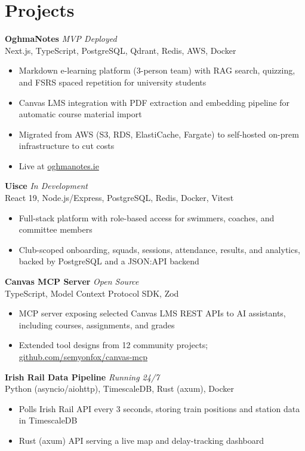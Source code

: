 \documentclass[11pt]{article}
\newcommand{\cventry}[4]{%
  \noindent\textbf{\large #1} \hfill \emph{#2}\\
  {\color{secondary}#3} \hfill {\color{secondary}#4}%
}
\begin{document}
\section*{Projects}

\cventry{OghmaNotes}{MVP Deployed}
        {Next.js, TypeScript, PostgreSQL, Qdrant, Redis, AWS, Docker}{}
\begin{itemize}
  \item Markdown e-learning platform (3-person team) with RAG search, quizzing, and FSRS spaced repetition for university students
  \item Canvas LMS integration with PDF extraction and embedding pipeline for automatic course material import
  \item Migrated from AWS (S3, RDS, ElastiCache, Fargate) to self-hosted on-prem infrastructure to cut costs
  \item Live at \href{https://oghmanotes.ie}{oghmanotes.ie}
\end{itemize}

\vspace{5pt}
\cventry{Uisce}{In Development}
        {React 19, Node.js/Express, PostgreSQL, Redis, Docker, Vitest}{}
\begin{itemize}
  \item Full-stack platform with role-based access for swimmers, coaches, and committee members
  \item Club-scoped onboarding, squads, sessions, attendance, results, and analytics, backed by PostgreSQL and a JSON:API backend
\end{itemize}

\vspace{5pt}
\cventry{Canvas MCP Server}{Open Source}
        {TypeScript, Model Context Protocol SDK, Zod}{}
\begin{itemize}
  \item MCP server exposing selected Canvas LMS REST APIs to AI assistants, including courses, assignments, and grades
  \item Extended tool designs from 12 community projects; \href{https://github.com/semyonfox/canvas-mcp}{github.com/semyonfox/canvas-mcp}
\end{itemize}

\vspace{5pt}
\cventry{Irish Rail Data Pipeline}{Running 24/7}
        {Python (asyncio/aiohttp), TimescaleDB, Rust (axum), Docker}{}
\begin{itemize}
  \item Polls Irish Rail API every 3 seconds, storing train positions and station data in TimescaleDB
  \item Rust (axum) API serving a live map and delay-tracking dashboard
\end{itemize}
\end{document}
